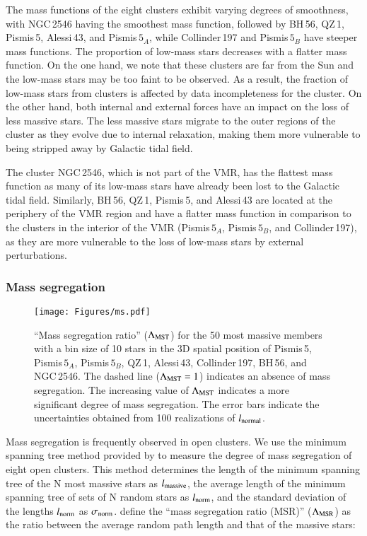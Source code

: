 \documentclass{aa} %
\begin{document}
The mass functions of the eight clusters exhibit varying degrees of smoothness, with NGC\,2546 having the smoothest mass function, followed by BH\,56, QZ\,1, Pismis\,5, Alessi\,43, and Pismis$\,5_{A}$, while Collinder\,197 and Pismis$\,5_B$ have steeper mass functions.
The proportion of low-mass stars decreases with a flatter mass function. 
On the one hand, we note that these clusters are far from the Sun and the low-mass stars may be too 
faint to be observed. As a result, the fraction of low-mass stars from clusters is affected by data 
incompleteness for the cluster. On the other hand, both internal and external forces have an impact on
the loss of less massive stars. The less massive stars migrate to the outer regions of the cluster as they evolve due to internal relaxation, making them more vulnerable to being stripped away by Galactic tidal field.


The cluster NGC\,2546, which is not part of the VMR, has the flattest mass function as many of its 
low-mass stars have already been lost to the Galactic tidal field.
Similarly, BH\,56, QZ\,1, Pismis\,5, and Alessi\,43 are located at  
the periphery of the VMR region and have a flatter mass function in comparison to the clusters in the 
interior of the VMR (Pismis$\,5_{A}$, Pismis$\,5_{B}$, and Collinder\,197), as they are more vulnerable to the loss of low-mass stars by external perturbations.


\subsubsection{Mass segregation} \label{sec:ms}
\begin{figure*}%
    \centering
    \texttt{[image: Figures/ms.pdf]}
    \caption{ ``Mass segregation ratio'' ($\Lambda_{\rm MST}$) for the 50 most massive 
    members with a bin size of 10 stars in the 3D spatial position of Pismis\,5, 
    Pismis$\,5_{A}$, Pismis$\,5_{B}$, QZ\,1, Alessi\,43, Collinder\,197, BH\,56, and NGC\,2546.
    The dashed line ($\Lambda_{\rm MST} = 1$) indicates an absence of mass 
    segregation. The increasing value of $\Lambda_{\rm MST}$ indicates a more significant 
    degree of mass segregation. The error bars indicate the uncertainties obtained 
    from 100 realizations of ${l}_{\rm normal}$.
    \label{fig:ms}}
    \end{figure*} 




Mass segregation is frequently observed in open clusters.
We use the minimum spanning tree method provided by \cite{2009MNRAS.395.1449A}
to measure the degree of mass segregation of eight open clusters. This method determines the length of 
the minimum spanning tree of the N most massive stars as $l_{\rm massive}$, the average length of 
the minimum spanning tree of sets of N random stars as $l_{\rm norm}$, and the standard deviation of 
the lengths $l_{\rm norm}$ as $\sigma_{\rm norm}$. \cite{2009MNRAS.395.1449A} define the ``mass 
segregation ratio (MSR)'' ($\Lambda_{\rm MSR}$) as the ratio between the average random 
path length and that of the massive stars:
\end{document}
